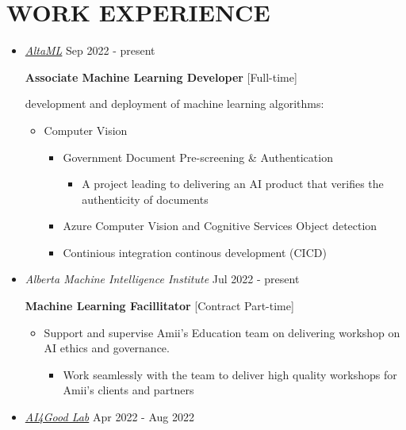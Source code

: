 \documentclass[11pt,a4paper,sans]{moderncv} %
\begin{document}
	\section{WORK EXPERIENCE}
	\begin{itemize}
		\item \href{http://altaml.com/}{ \emph{AltaML}} \hfill Sep 2022 - present
		
		\textbf{Associate Machine Learning Developer} [Full-time]
		
		development and deployment of machine learning algorithms: 
		\begin{itemize}
			\item Computer Vision
			\begin{itemize}
				\item Government Document Pre-screening \& Authentication
				\begin{itemize}
				    \item A project leading to delivering an AI product that verifies the authenticity of documents
				\end{itemize}
				\item Azure Computer Vision and Cognitive Services Object detection
				\item Continious integration continous development (CICD)

			\end{itemize}
		\end{itemize}
		
		\item \href{https://amii.ca/}{} \emph{Alberta Machine Intelligence Institute} \hfill Jul 2022 - present
		
        \textbf{Machine Learning Facillitator} [Contract Part-time]
        \begin{itemize}
			\item Support and supervise Amii's Education team on delivering workshop on AI ethics and governance.
			\begin{itemize}
			    \item Work seamlessly with the team to deliver high quality workshops for Amii's clients and partners
			\end{itemize}
            
		\end{itemize}
	\item \href{http://ai4goodlab.com/}{ \emph{AI4Good Lab}} \hfill Apr 2022 - Aug 2022
	

\end{itemize}
\end{document}
